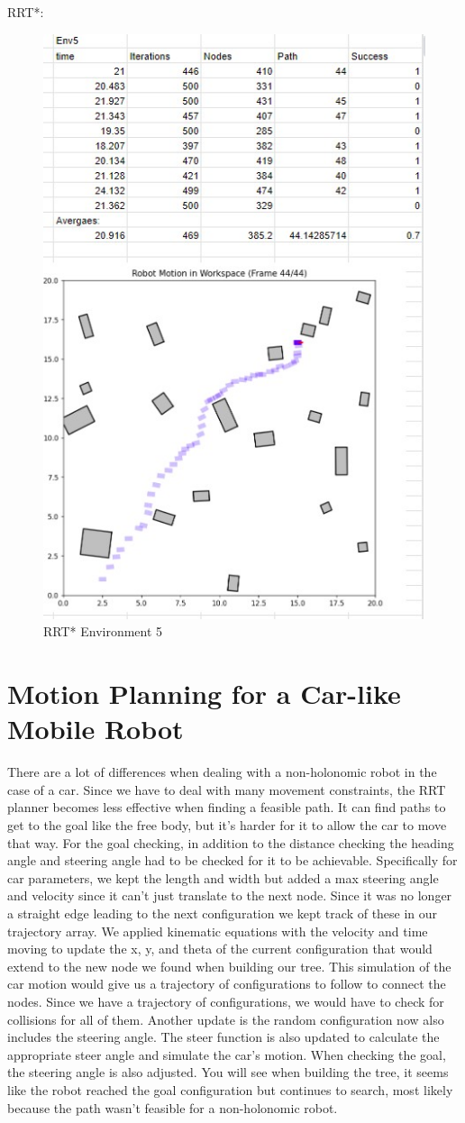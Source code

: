 \documentclass{article}
\begin{document}
    RRT*: 
    \begin{figure} [H]
        \centering
        \includegraphics[width=0.5\linewidth]{latex_media/RRTStarEnv5Stats.jpg}
        \caption{RRT* Environment 5}
    \end{figure}

\section{Motion Planning for a Car-like Mobile Robot}
There are a lot of differences when dealing with a non-holonomic robot in the case of a car. Since we have to deal with many movement constraints, the RRT planner becomes less effective when finding a feasible path. It can find paths to get to the goal like the free body, but it's harder for it to allow the car to move that way. For the goal checking, in addition to the distance checking the heading angle and steering angle had to be checked for it to be achievable. Specifically for car parameters, we kept the length and width but added a max steering angle and velocity since it can't just translate to the next node. Since it was no longer a straight edge leading to the next configuration we kept track of these in our trajectory array. We applied kinematic equations with the velocity and time moving to update the x, y, and theta of the current configuration that would extend to the new node we found when building our tree. This simulation of the car motion would give us a trajectory of configurations to follow to connect the nodes. Since we have a trajectory of configurations, we would have to check for collisions for all of them. Another update is the random configuration now also includes the steering angle. The steer function is also updated to calculate the appropriate steer angle and simulate the car's motion. When checking the goal, the steering angle is also adjusted. You will see when building the tree, it seems like the robot reached the goal configuration but continues to search, most likely because the path wasn't feasible for a non-holonomic robot. 
\end{document}
